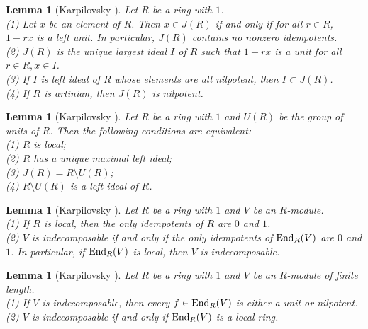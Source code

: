 \documentclass{amsart}
\theoremstyle{plain}
\newtheorem{lemma}[theorem]{Lemma}
\theoremstyle{definition}
\theoremstyle{remark}
\newcounter{sub}\def\tr{\mbox{tr }}
\def\End{\mbox{\rm End}}
\begin{document}
\begin{lemma}[{Karpilovsky \cite[Chapter 1, Proposition 6.18, Proposition 6.19, Corollary 6.21, Proposition 6.22]{Kar87}}]\label{lem7.6}
Let $R$ be a ring with $1$.\\
{\rm (1)} 
Let $x$ be an element of $R$. 
Then $x \in J(R)$ if and only if for all $r \in R$, $1-rx$ is a left unit. 
In particular, $J(R)$ contains no nonzero idempotents.\\ 
{\rm (2)}
$J(R)$ is the unique largest ideal $I$ of $R$
such that $1-rx$ is a unit for all $r \in R, x \in I$.\\
{\rm (3)} If $I$ is left ideal of $R$ whose elements are all nilpotent, 
then $I\subset J(R)$.\\
{\rm (4)} If $R$ is artinian, then $J(R)$ is nilpotent.
\end{lemma}

\begin{lemma}[{Karpilovsky \cite[Chapter 1, Lemma 7.1]{Kar87}}]
\label{lem7.7}
Let $R$ be a ring with $1$ 
and $U(R)$ be the group of units of $R$.
Then the following conditions are equivalent:\\
{\rm (1)} $R$ is local;\\
{\rm (2)} $R$ has a  unique maximal left ideal;\\
{\rm (3)} $J(R)=R\setminus U(R)$;\\
{\rm (4)} $R\setminus U(R)$ is a left ideal of $R$.
\end{lemma}

\begin{lemma}[{Karpilovsky \cite[Chapter 1, Corollary 7.2, Lemma 7.3]{Kar87}}]
\label{lem7.8}
Let $R$ be a ring with $1$ and $V$ be an $R$-module.\\
{\rm (1)} If $R$ is local, then the only idempotents of $R$ are $0$ and $1$.\\
{\rm (2)} $V$ is indecomposable if and only if the only idempotents of 
$\End_R(V)$ are $0$ and $1$. 
In particular, if $\End_R(V)$ is local, then $V$ is indecomposable. 
\end{lemma}

\begin{lemma}[{Karpilovsky \cite[Chapter 1, Lemma 7.4]{Kar87}}]
\label{lem7.9}
Let $R$ be a ring with $1$ 
and $V$ be an $R$-module of finite length.\\
{\rm (1)} If $V$ is indecomposable, then every $f \in \End_R(V)$ is
either a unit or nilpotent.\\
{\rm (2)} $V$ is indecomposable if and only if $\End_R(V)$ is a local ring.
\end{lemma}
\end{document}
